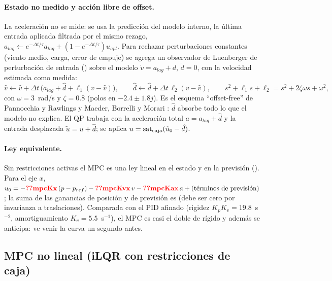 \paragraph{Estado no medido y acción libre de offset.} La aceleración no se
mide: se usa la predicción del modelo interno, la última entrada aplicada
filtrada por el mismo rezago,
$a_{lag}\leftarrow e^{-\Delta t/\tau}a_{lag}+(1-e^{-\Delta t/\tau})u_{apl}$. Para
rechazar perturbaciones constantes (viento medio, carga, error de empuje)
se agrega un observador de Luenberger de perturbación de entrada
() sobre el modelo $\dot v=a_{lag}+d$,
$\dot d=0$, con la velocidad estimada como medida:
\begin{equation}
\hat v\leftarrow\hat v+\Delta t\,\big(a_{lag}+\hat d+\ell_1(v-\hat v)\big),\qquad
\hat d\leftarrow\hat d+\Delta t\,\ell_2(v-\hat v),\qquad
s^2+\ell_1s+\ell_2=s^2+2\zeta\omega s+\omega^2,
\label{eq:dob}
\end{equation}
con $\omega=3$~rad/s y $\zeta=0.8$ (polos en $-2.4\pm1.8j$). Es el esquema
``offset-free'' de Pannocchia y Rawlings \cite{pannocchia03} y Maeder,
Borrelli y Morari \cite{maeder09}: $\hat d$ absorbe todo lo que el modelo no
explica. El QP trabaja con la aceleración total $a=a_{lag}+\hat d$ y la
entrada desplazada $\tilde u=u+\hat d$; se aplica
$u=\operatorname{sat}_{\text{caja}}(\tilde u_0-\hat d)$.

\paragraph{Ley equivalente.} Sin restricciones activas el MPC es una ley
lineal en el estado y en la previsión (). Para el eje $x$,
$u_0=-\val{mpcKx}\,(p-p_{ref})-\val{mpcKvx}\,v-\val{mpcKax}\,a+(\text{términos de previsión})$;
la suma de las ganancias de posición y de previsión es  (debe ser
cero por invarianza a traslaciones). Comparada con el PID afinado (rigidez
$K_pK_v=19.8$~s$^{-2}$, amortiguamiento $K_v=5.5$~s$^{-1}$), el MPC es casi
el doble de rígido y además se anticipa: ve venir la curva un segundo antes.

\subsection{MPC no lineal (iLQR con restricciones de caja)}

